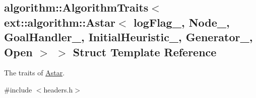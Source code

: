 \hypertarget{structalgorithm_1_1AlgorithmTraits_3_01ext_1_1algorithm_1_1Astar_3_01logFlag___00_01Node___00_0150730e157d356b1ae70a0950fbe22d80}{}\subsection{algorithm\+:\+:Algorithm\+Traits$<$ ext\+:\+:algorithm\+:\+:Astar$<$ log\+Flag\+\_\+, Node\+\_\+, Goal\+Handler\+\_\+, Initial\+Heuristic\+\_\+, Generator\+\_\+, Open $>$ $>$ Struct Template Reference}
\label{structalgorithm_1_1AlgorithmTraits_3_01ext_1_1algorithm_1_1Astar_3_01logFlag___00_01Node___00_0150730e157d356b1ae70a0950fbe22d80}


The traits of \hyperlink{structAstar}{Astar}.  




{\ttfamily \#include $<$headers.\+h$>$}

